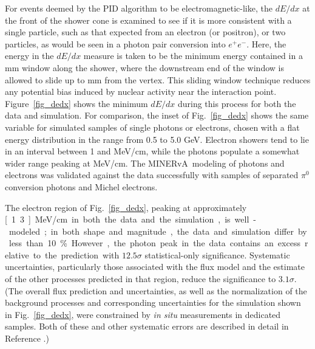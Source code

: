 \documentclass[%
preprint,
 amsmath,amssymb,
 aps,
]{revtex4-1}
\newcommand{\minerva}{\mbox{MINERvA}}
\begin{document}
For events deemed by the PID algorithm to be electromagnetic-like, the $dE/dx$ at the front of the shower cone is examined to see if it is more consistent with a single particle, such as that expected from an electron (or positron), or two particles, as would be seen in a photon pair conversion into $e^{+} e^{-}$. Here, the energy in the $dE/dx$ measure is taken to be the minimum energy contained in a \unit[100]{mm} window along the shower, where the downstream end of the window is allowed to slide up to \unit[500]{mm} from the vertex.
This sliding window technique reduces any potential bias induced by nuclear activity near the interaction point\cite{numuPRL}. Figure~\ref{fig_dedx} shows the minimum $dE/dx$ during this process for both the data and simulation.  For comparison,  the inset of Fig.~\ref{fig_dedx} shows the same variable for simulated samples of single photons or electrons, chosen with a flat energy distribution in the range from 0.5 to 5.0 GeV.  Electron showers tend to lie in an interval between 1 and \unit[2]{MeV/cm}, while the photons populate a somewhat wider range peaking at \unit[3]{MeV/cm}.   
The \minerva \ modeling of photons and electrons was validated against the data successfully with samples of separated $\pi^{0}$ conversion photons and Michel electrons\cite{MINERvA_NIM}.  

The electron region of Fig.~\ref{fig_dedx}, peaking at approximately \unit[1.3]{MeV/cm} in both the data and the simulation, is well-modeled; in both shape and magnitude, the data and simulation differ by less than 10\%.  However, the photon peak in the data contains an excess relative to the prediction with $12.5\sigma$ statistical-only significance.  Systematic uncertainties, particularly those associated with the flux model and the estimate of the other processes predicted in that region, reduce the significance to  $3.1\sigma$.  (The overall flux prediction and uncertainties, as well as the normalization of the background processes and corresponding uncertainties for the simulation shown in Fig.~\ref{fig_dedx}, were constrained by \textit{in situ} measurements in dedicated samples.  Both of these and other systematic errors are described in detail in Reference \cite{minervaNueCCQE}.)  
\end{document}
